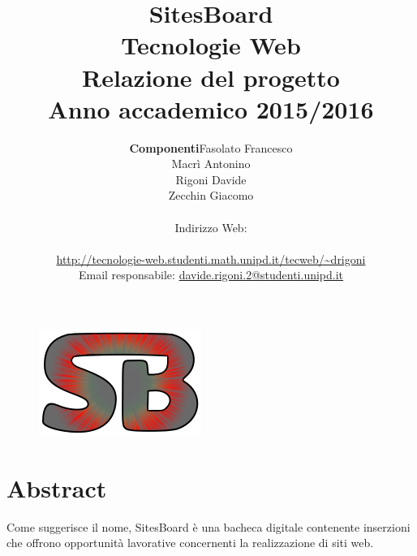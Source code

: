 \documentclass[12pt]{article}
\begin{document}
\begin{figure}
\centering
\includegraphics[angle=0]{img/logo.png}
\end{figure} 

\title{ \textbf{{\Huge SitesBoard}}\vspace{2cm} \\ {\Huge Tecnologie Web \\ Relazione del progetto} \\ {\Large Anno accademico 2015/2016} }
 
\author{
\begin{tabular}{r|l}
\textbf{Componenti} & Fasolato Francesco\\
&Macrì Antonino\\
&Rigoni Davide\\
&Zecchin Giacomo
\end{tabular}\vspace{0.5cm} \\
	Indirizzo Web: \\ \\ \url{http://tecnologie-web.studenti.math.unipd.it/tecweb/~drigoni}\vspace{0.3cm} \\
	Email responsabile: \href{mailto:davide.rigoni.2@studenti.unipd.it}{davide.rigoni.2@studenti.unipd.it} 
}

\maketitle
\thispagestyle{empty}


\newpage


\pagestyle{fancy}
\lhead{}
\cfoot{}
\renewcommand{\footrulewidth}{0.5pt}

\tableofcontents %



\newpage

\section{Abstract}
Come suggerisce il nome, SitesBoard è una bacheca digitale contenente inserzioni che offrono opportunità lavorative concernenti la realizzazione di siti web.
\end{document}
